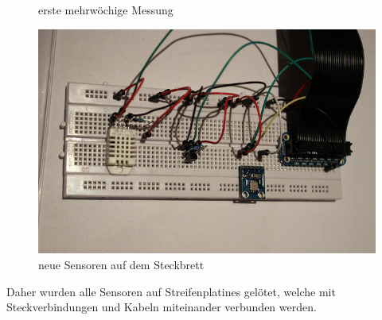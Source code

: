 \begin{figure}[h]
\begin{minipage}[b]{0.45\textwidth}
		\caption{erste mehrwöchige Messung}
	\end{minipage}\hfill
	\begin{minipage}[b]{0.45\textwidth}
		\centering
		\includegraphics[width=\textwidth]{figures/anschluss/1_4.jpg}
		\caption{neue Sensoren auf dem \gls{Steckbrett}}
	\end{minipage}
\end{figure}

Daher wurden alle Sensoren auf \glspl{Streifenplatine} gelötet, welche mit Steckverbindungen und Kabeln miteinander verbunden werden.

